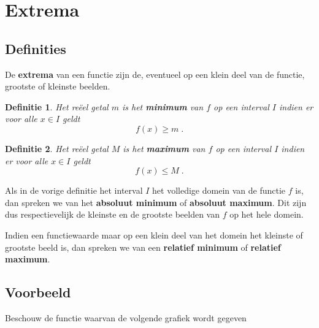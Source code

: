 \documentclass[12pt,twoside]{article}
\newtheorem{definition}{Definitie}
\begin{document}
\newpage

\section{Extrema}

\begin{theorie}

\subsection{Definities}

De {\bf extrema} van een functie zijn de, eventueel op een klein deel van de functie, grootste of kleinste beelden.

\begin{definition}
  Het reëel getal $m$ is het {\bf minimum} van $f$ op een interval $I$ indien er voor alle $x\in I$ geldt
  $$f(x)\geq m\;.$$
\end{definition}

\begin{definition}
  Het reëel getal $M$ is het {\bf maximum} van $f$ op een interval $I$ indien er voor alle $x\in I$ geldt
  $$f(x)\leq M\;.$$
\end{definition}

Als in de vorige definitie het interval $I$ het volledige domein van de functie $f$ is, dan spreken we van het {\bf absoluut minimum} of {\bf absoluut maximum}. Dit zijn dus respectievelijk de kleinste en de grootste beelden van $f$ op het hele domein.

Indien een functiewaarde maar op een klein deel van het domein het kleinste of grootste beeld is, dan spreken we van een {\bf relatief minimum} of {\bf relatief maximum}.

\subsection{Voorbeeld}

Beschouw de functie waarvan de volgende grafiek wordt gegeven


\end{theorie}
\end{document}
